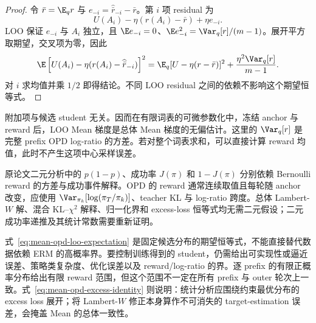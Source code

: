 \begin{proof}
令 $\bar r=\E_qr$ 与 $e_{-i}=\widehat{\bar r}_{-i}-\bar r$。第 $i$ 项 residual 为
\[
 U(A_i)-\eta(r(A_i)-\bar r)+\eta e_{-i}.
\]
LOO 保证 $e_{-i}$ 与 $A_i$ 独立，且 $\E e_{-i}=0$、$\E e_{-i}^2=\Var_q[r]/(m-1)$。展开平方取期望，交叉项为零，因此
\[
 \E\left[U(A_i)-\eta(r(A_i)-\widehat{\bar r}_{-i})\right]^2
 =\E_q[U-\eta(r-\bar r)]^2
  +\frac{\eta^2\Var_q[r]}{m-1}.
\]
对 $i$ 求均值并乘 $1/2$ 即得结论。不同 LOO residual 之间的依赖不影响这个期望恒等式。
\end{proof}

附加项与候选 student 无关。因而在有限词表的可微参数化中，冻结 anchor 与 reward 后，LOO Mean 梯度是总体 Mean 梯度的无偏估计。这里的 $\Var_q[r]$ 是完整 prefix OPD log-ratio 的方差。若对整个词表求和，可以直接计算 reward 均值，此时不产生这项中心采样误差。

原论文二元分析中的 $p(1-p)$、成功率 $J(\pi)$ 和 $1-J(\pi)$ 分别依赖 Bernoulli reward 的方差与成功事件解释。OPD 的 reward 通常连续取值且每轮随 anchor 改变，应使用 $\Var_{\pi_k}[\log(\pi_T/\pi_k)]$、teacher KL 与 log-ratio 跨度。总体 Lambert-$W$ 解、混合 KL--$\chi^2$ 解释、归一化界和 excess-loss 恒等式均无需二元假设；二元成功率递推及其统计常数需要重新证明。

式~\eqref{eq:mean-opd-loo-expectation} 是固定候选分布的期望恒等式，不能直接替代数据依赖 ERM 的高概率界。要控制训练得到的 student，仍需给出可实现性或逼近误差、策略类复杂度、优化误差以及 reward/log-ratio 的界。逐 prefix 的有限正概率分布给出有限 reward 范围，但这个范围不一定在所有 prefix 与 outer 轮次上一致。式~\eqref{eq:mean-opd-excess-identity} 则说明：统计分析应围绕约束最优分布的 excess loss 展开；将 Lambert-$W$ 修正本身算作不可消失的 target-estimation 误差，会掩盖 Mean 的总体一致性。
